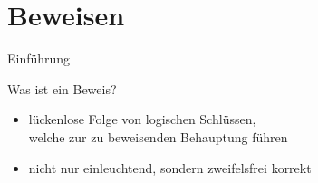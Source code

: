 \section{Beweisen}

\begin{frame}{Einführung}
\begin{alertblock}{Was ist ein Beweis?}
\begin{itemize}
        \item lückenlose Folge von logischen Schlüssen,\\welche zur zu beweisenden Behauptung führen
        \item nicht nur einleuchtend, sondern zweifelsfrei korrekt
    \end{itemize}
\end{alertblock}
\end{frame}

